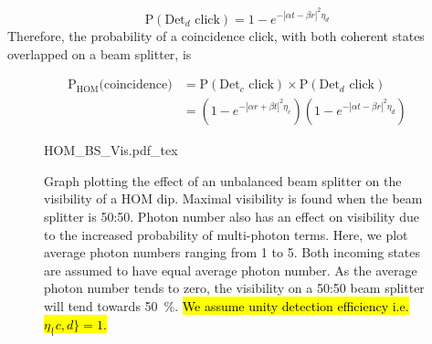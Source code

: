 \begin{equation}
	\text{P}(\text{Det}_d \text{ click}) = 1 - e^{-|\alpha t - \beta r|^2 \eta_d}
\end{equation}
Therefore, the probability of a coincidence click, with both coherent states overlapped on a beam splitter, is

\begin{align}
	\text{P}_\text{HOM}\text{(coincidence)} &= \text{P}(\text{Det}_c \text{ click}) \times \text{P}(\text{Det}_d \text{ click})\\
	&= \left(1 - e^{-|\alpha r + \beta t|^2 \eta_c}\right)\left(1 - e^{-|\alpha t - \beta r|^2 \eta_d}\right)
\end{align}



\begin{figure}[t]
	\centering
	\small
	\def\svgwidth{0.8\textwidth} 
	{HOM_BS_Vis.pdf_tex}
	\caption[Coherent state photon number visibility against beam splitter ratio]{Graph plotting the effect of an unbalanced beam splitter on the visibility of a HOM dip. Maximal visibility is found when the beam splitter is 50:50. Photon number also has an effect on visibility due to the increased probability of multi-photon terms. Here, we plot average photon numbers ranging from 1 to 5. Both incoming states are assumed to have equal average photon number. As the average photon number tends to zero, the visibility on a 50:50 beam splitter will tend towards \SI{50}{\percent}. \hl{We assume unity detection efficiency i.e. $\eta_\{c,d\} = 1$.}}
	\label{fig:HOM_BS_Vis}
\end{figure}

